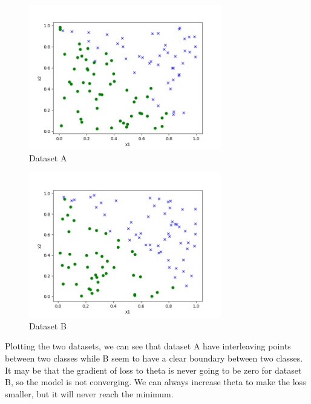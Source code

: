 \begin{answer}
    \begin{figure}[H]
        \centering
        \includegraphics[width=0.75\textwidth]{../src/stability/ds1_a.png}
        \caption{Dataset A}
        \label{fig:ds1-a}
    \end{figure}
    \begin{figure}[H]
        \centering
        \includegraphics[width=0.75\textwidth]{../src/stability/ds1_b.png}
        \caption{Dataset B}
        \label{fig:ds1-b}
    \end{figure}
    Plotting the two datasets, we can see that dataset A have interleaving
    points between two classes while B seem to have a clear boundary between
    two classes. It may be that the gradient of loss to theta is never going
    to be zero for dataset B, so the model is not converging. We can always 
    increase theta to make the loss smaller, but it will never reach the minimum.
\end{answer}
